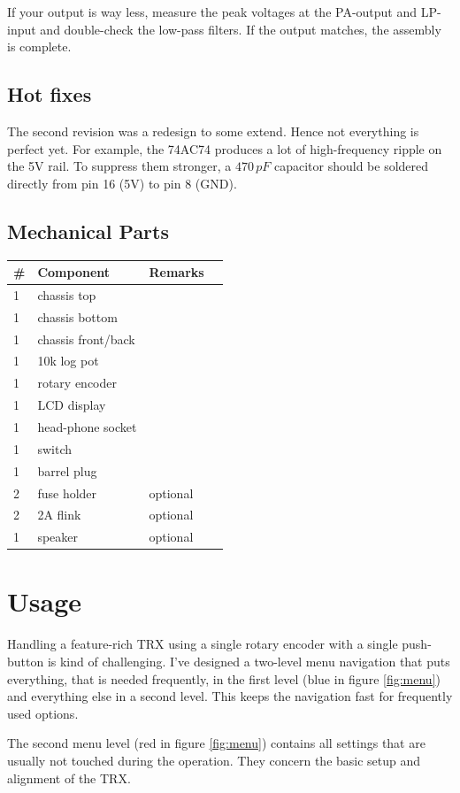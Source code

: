 \documentclass[10pt, a4paper,twoside,openright]{scrartcl}
\begin{document}
If your output is way less, measure the peak voltages at the PA-output and LP-input and double-check the low-pass filters. If the output matches, the assembly is complete. 

\subsection{Hot fixes}
The second revision was a redesign to some extend. Hence not everything is perfect yet. For example, the 74AC74 produces a lot of high-frequency ripple on the 5V rail. To suppress them stronger, a $470\,pF$ capacitor should be soldered directly from pin 16 (5V) to pin 8 (GND).  

\clearpage
\subsection{Mechanical Parts}
\begin{longtable}{|l|p{6cm}|l|l|} \hline 
\# & Component & Remarks \\ \hline 
1 & chassis top & \\
1 & chassis bottom & \\
1 & chassis front/back & \\
1 & 10k log pot & \\
1 & rotary encoder & \\
1 & LCD display & \\
1 & head-phone socket & \\
1 & switch & \\
1 & barrel plug & \\
2 & fuse holder & optional \\
2 & 2A flink & optional \\
1 & speaker & optional \\ \hline
\end{longtable}


\cleardoublepage
\section{Usage} \label{sec:user}
Handling a feature-rich TRX using a single rotary encoder with a single push-button is kind of challenging. I've designed a two-level menu navigation that puts everything, that is needed frequently, in the first level (blue in figure \ref{fig:menu}) and everything else in a second level. This keeps the navigation fast for frequently used options. 

The second menu level (red in figure \ref{fig:menu}) contains all settings that are usually not touched during the operation. They concern the basic setup and alignment of the TRX. 
\end{document}
